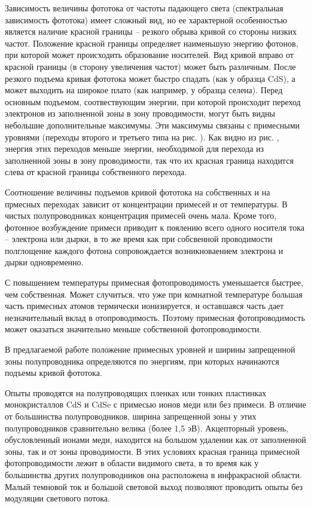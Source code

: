 \documentclass[a4paper,12pt]{article} %
\begin{document}
	Зависимость величины фототока от частоты падающего света (спектральная зависимость фототока) имеет сложный вид, но ее характерной особенностью является наличие красной границы -- резкого обрыва кривой со стороны низких частот. Положение красной границы определяет наименьшую энергию фотонов, при которой может происходить образование носителей. Вид кривой вправо от красной границы (в сторону увеличения частот) может быть различным. После резкого подъема кривая фототока может быстро спадать (как у образца CdS), а может выходить на широкое плато (как например, у образца селена). Перед основным подъемом, соотвествующим энергии, при которой происходит переход электронов из заполненной зоны в зону проводимости, могут быть видны небольшие дополнительные максимумы. Эти максимумы связаны с примесными уровнями (переходы второго и третьего типа на рис. ). Как видно из рис. , энергия этих переходов меньше энергии, необходимой для перехода из заполненной зоны в зону проводимости, так что их красная граница находится слева от красной границы собственного перехода.

	Соотношение величины подъемов кривой фототока на собственных и на прмесных переходах зависит от концентрации примесей и от температуры. В чистых полупроводниках концентрация примесей очень мала. Кроме того, фотонное возбуждение примеси приводит к поялению всего одного носителя тока -- электрона или дырки, в то же время как при собсвенной проводимости полглощение каждого фотона сопровождается возникноваением электрона и дырки одновременно.

	С повышением температуры примесная фотопроводимость уменьшается быстрее, чем собственная. Может случиться, что уже при комнатной температуре большая часть примесных атомов термически ионизируется, и оставшаяся часть дает незначительный вклад в отопроводимость. Поэтому примесная фотопроводимость может оказаться значительно меньше собственной фотопроводимости.

	В предлагаемой работе положение примесных уровней и ширины запрещенной зоны полупроводника определяются по энергиям, при которых начинаются подъемы кривой фототока.

	Опыты проводятся на полупроводящих пленках или тонких пластинках монокристаллов CdS и CdSe с примесью ионов меди или без примеси. В отличие от большинства полупроводников, ширина запрещенной зоны у этих полупроводников сравнительно велика (более 1,5 эВ). Акцепторный уровень, обусловленный ионами меди, находится на большом удалении как от заполненной зоны, так и от зоны проводимости. В этих условиях красная граница примесной фотопроводимости лежит в области видимого света, в то время как у большинства других полупроводников она расположена в инфракрасной  области. Малый темновой ток и большой световой выход позволяют проводить опыты без модуляции светового потока.
\end{document}
